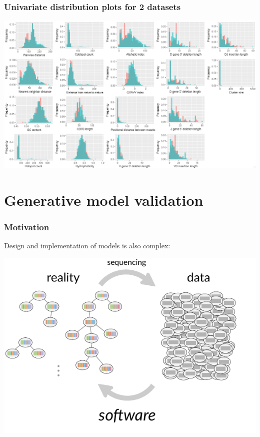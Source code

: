 \documentclass[mathserif,compress]{beamer}
\renewcommand\;{\,}
\begin{document}
\begin{frame}\frametitle{Univariate distribution plots for 2 datasets}
\begin{center}
\includegraphics[width=\linewidth]{Images/Dual_summaries.png}
\end{center}
\end{frame}

\section{Generative model validation}

\begin{frame}\frametitle{Motivation}
Design and implementation of models is also complex:
\begin{center}
\includegraphics[width=0.8 \linewidth]{Images/bcell-mess-software.pdf}
\end{center}
\end{frame}
\end{document}
